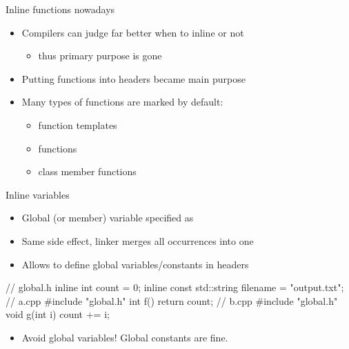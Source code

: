 \begin{frame}[fragile]
  \begin{block}{Inline functions nowadays}
    \begin{itemize}
      \item Compilers can judge far better when to inline or not
        \begin{itemize}
        \item thus primary purpose is gone
        \end{itemize}
      \item Putting functions into headers became main purpose
      \item Many types of functions are marked  by default:
      \begin{itemize}
        \item function templates
        \item {} functions
        \item class member functions
      \end{itemize}
    \end{itemize}
  \end{block}
\end{frame}

\begin{frame}[fragile]
  \begin{block}{Inline variables}
    \begin{itemize}
      \item Global (or  member) variable specified as 
      \item Same side effect, linker merges all occurrences into one
      \item Allows to define global variables/constants in headers
    \end{itemize}
  \end{block}
  \begin{block}{}
    \small
    \begin{cppcode*}{}
      // global.h
      inline int count = 0;
      inline const std::string filename = "output.txt";
      // a.cpp
      #include "global.h"
      int f() { return count; }
      // b.cpp
      #include "global.h"
      void g(int i) { count += i; }
    \end{cppcode*}
  \end{block}
  \begin{alertblock}{}
    \begin{itemize}
      \item Avoid global variables! Global constants are fine.
    \end{itemize}
  \end{alertblock}
\end{frame}
